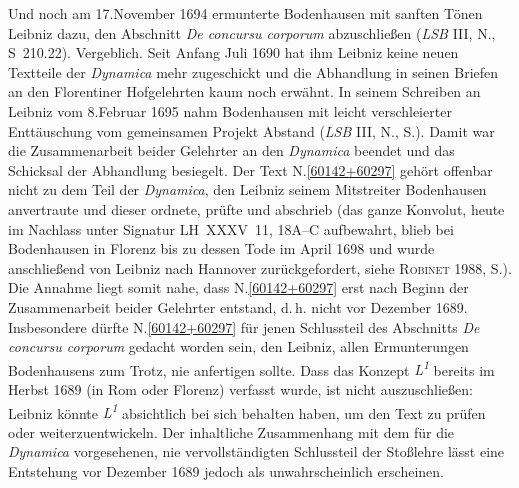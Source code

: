 Und noch am 17.\;November 1694 ermunterte Bodenhausen mit sanften Tönen Leibniz dazu, den Abschnitt \textit{De concursu corporum} abzuschließen (\textit{LSB} III, N., S~210.22).\cite{01395}
Vergeblich.
Seit Anfang Juli 1690 hat ihm Leibniz keine neuen Textteile der \textit{Dynamica}\cite{01354} mehr zugeschickt und die Abhandlung in seinen Briefen an den Florentiner Hofgelehrten kaum noch erwähnt.
In seinem Schreiben an Leibniz vom 8.\;Februar 1695 nahm Bodenhausen mit leicht verschleierter Enttäuschung vom gemeinsamen Projekt Abstand (\textit{LSB} III, N., S.).\cite{01396}
Damit war die Zusammenarbeit beider Gelehrter an den \textit{Dynamica}\cite{01354} beendet und das Schicksal der Abhandlung besiegelt.%
\pend%
\pstart%
Der Text N.\;\ref{60142+60297} gehört offenbar nicht zu dem Teil der \textit{Dynamica},\cite{01354} den Leibniz seinem Mitstreiter Bodenhausen anvertraute und dieser ordnete, prüfte und abschrieb (das ganze Konvolut, heute im Nachlass unter Signatur LH~XXXV~11, 18A--C aufbewahrt, blieb bei Bodenhausen in Florenz bis zu dessen Tode im April 1698 und wurde anschließend von Leibniz nach Hannover zurückgefordert, siehe \textsc{Robinet} 1988, S.).\cite{01240}
Die Annahme liegt somit nahe, dass N.\;\ref{60142+60297} erst nach Beginn der Zusammenarbeit beider Gelehrter entstand, d.\,h. nicht vor Dezember 1689.
Insbesondere dürfte N.\;\ref{60142+60297} für jenen Schlussteil des Abschnitts \textit{De concursu corporum} gedacht worden sein, den Leibniz, allen Ermunterungen Bodenhausens zum Trotz, nie anfertigen sollte.
Dass das Konzept \textit{L\textsuperscript{1}} bereits im Herbst 1689 (in Rom oder Florenz) verfasst wurde, ist nicht auszuschließen:
Leibniz könnte \textit{L\textsuperscript{1}} absichtlich bei sich behalten haben, um den Text zu prüfen oder weiterzuentwickeln.
Der inhaltliche Zusammenhang mit dem für die \textit{Dynamica} vorgesehenen, nie vervollständigten Schlussteil der Stoßlehre lässt eine Entstehung vor Dezember 1689 jedoch als unwahrscheinlich erscheinen.
